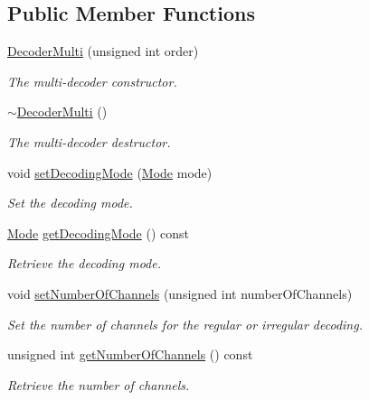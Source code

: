 \subsection*{Public Member Functions}
\begin{DoxyCompactItemize}
\item 
\hyperlink{class_hoa2_d_1_1_decoder_multi_afb4e1343b79a628a848b18a5237b4fe7}{Decoder\-Multi} (unsigned int order)
\begin{DoxyCompactList}\small\item\em The multi-\/decoder constructor. \end{DoxyCompactList}\item 
\hyperlink{class_hoa2_d_1_1_decoder_multi_a2a0aeff9157db4a486fa331b3dcd04cc}{$\sim$\-Decoder\-Multi} ()
\begin{DoxyCompactList}\small\item\em The multi-\/decoder destructor. \end{DoxyCompactList}\item 
void \hyperlink{class_hoa2_d_1_1_decoder_multi_a4c438ae79d50e9c01db919a76b506326}{set\-Decoding\-Mode} (\hyperlink{class_hoa2_d_1_1_decoder_multi_a0ac23d6bd77378d9cd5ddf6e71029300}{Mode} mode)
\begin{DoxyCompactList}\small\item\em Set the decoding mode. \end{DoxyCompactList}\item 
\hyperlink{class_hoa2_d_1_1_decoder_multi_a0ac23d6bd77378d9cd5ddf6e71029300}{Mode} \hyperlink{class_hoa2_d_1_1_decoder_multi_acc6e268ffd3e58bb9918d51c9dca282c}{get\-Decoding\-Mode} () const 
\begin{DoxyCompactList}\small\item\em Retrieve the decoding mode. \end{DoxyCompactList}\item 
void \hyperlink{class_hoa2_d_1_1_decoder_multi_a807edafa3240a9815a52d686307bb2b4}{set\-Number\-Of\-Channels} (unsigned int number\-Of\-Channels)
\begin{DoxyCompactList}\small\item\em Set the number of channels for the regular or irregular decoding. \end{DoxyCompactList}\item 
unsigned int \hyperlink{class_hoa2_d_1_1_decoder_multi_ae7c6a450a9a9ff184965f70556e7bf9d}{get\-Number\-Of\-Channels} () const 
\begin{DoxyCompactList}\small\item\em Retrieve the number of channels. \end{DoxyCompactList}\item 

\end{DoxyCompactItemize}

